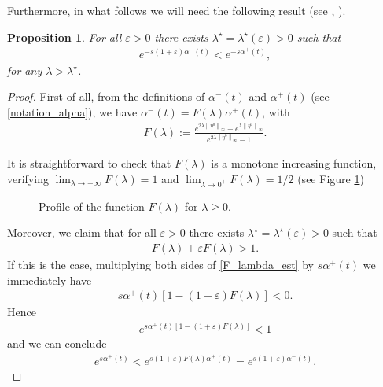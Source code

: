 \documentclass{amsart}    %
\newcommand{\norm}[2]{\left\|#1\right\|_{#2}}
\newtheorem{proposition}{\bf Proposition}[section]
\begin{document}
Furthermore, in what follows we will need the following result (see \cite[Lemma 6.1]{montoya2017robust}, \cite{gueye2013insensitizing}). 

\begin{proposition}\label{alpha_min_max_prop}
For all $\varepsilon>0$ there exists $\lambda^\star=\lambda^\star(\varepsilon)>0$ such that 
\begin{align}\label{alpha_min_max}
	e^{-s(1+\varepsilon)\alpha^-(t)}< e^{-s\alpha^+(t)},
\end{align}
for any $\lambda>\lambda^\star$.
\end{proposition}

\begin{proof}
First of all, from the definitions of $\alpha^-(t)$ and $\alpha^+(t)$ (see \eqref{notation_alpha}), we have $\alpha^-(t)=F(\lambda)\alpha^+(t)$, with
\begin{align*}
	F(\lambda):=\frac{e^{2\lambda\norm{\eta^0}{\infty}}-e^{\lambda\norm{\eta^0}{\infty}}}{e^{2\lambda\norm{\eta^0}{\infty}}-1}.
\end{align*}

It is straightforward to check that $F(\lambda)$ is a monotone increasing function, verifying $\lim_{\lambda\to+\infty} F(\lambda) = 1$ and $\lim_{\lambda\to 0^+} F(\lambda) = 1/2$ (see Figure \ref{F_lambda_fig}) 
\begin{figure}[h]
	\centering 
	\caption{Profile of the function $F(\lambda)$ for $\lambda\geq 0$.}\label{F_lambda_fig}
\end{figure}

Moreover, we claim that for all $\varepsilon>0$ there exists $\lambda^\star=\lambda^\star(\varepsilon)>0$ such that 
\begin{align}\label{F_lambda_est}
	F(\lambda) + \varepsilon F(\lambda)> 1.
\end{align}
If this is the case, multiplying both sides of \eqref{F_lambda_est} by $s\alpha^+(t)$ we immediately have 
\begin{align*}
	s\alpha^+(t)\left[1-(1+\varepsilon)F(\lambda)\right]< 0.
\end{align*}
Hence
\begin{align*}
e^{s\alpha^+(t)\left[1-(1+\varepsilon)F(\lambda)\right]}< 1
\end{align*}
and we can conclude
\begin{align*}
e^{s\alpha^+(t)} < e^{s(1+\varepsilon)F(\lambda)\alpha^+(t)} = e^{s(1+\varepsilon)\alpha^-(t)}.
\end{align*}


\end{proof}
\end{document}
